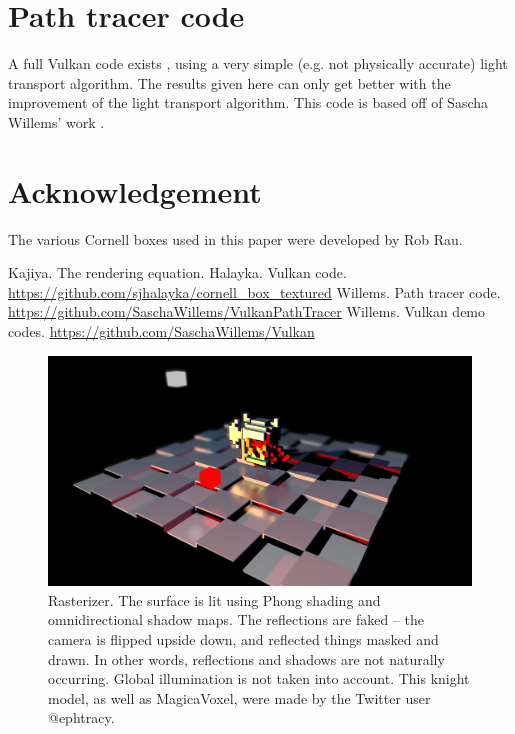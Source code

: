 \documentclass[12pt]{article}
\begin{document}
\section{Path tracer code}
A full Vulkan code exists \cite{halayka}, using a very simple (e.g. not physically accurate) light transport algorithm.
The results given here can only get better with the improvement of the light transport algorithm.
This code is based off of Sascha Willems' work \cite{willems1, willems2}.



\section{Acknowledgement}

The various Cornell boxes used in this paper were developed by Rob Rau.






\begin{thebibliography}{9}

 Kajiya. The rendering equation.
 Halayka. Vulkan code. \url{https://github.com/sjhalayka/cornell_box_textured}
 Willems. Path tracer code. \url{https://github.com/SaschaWillems/VulkanPathTracer}
 Willems. Vulkan demo codes. \url{https://github.com/SaschaWillems/Vulkan}


\end{thebibliography}


\pagebreak




\begin{figure} 
\centering
  \includegraphics[width = 6 in]{rasterizer.png}
  \caption{ Rasterizer.
The surface is lit using Phong shading and omnidirectional shadow maps.
The reflections are faked -- the camera is flipped upside down, and reflected things masked and drawn.
In other words, reflections and shadows are not naturally occurring.
Global illumination is not taken into account.
This knight model, as well as MagicaVoxel, were made by the Twitter user @ephtracy.
}

\end{figure}
\end{document}

